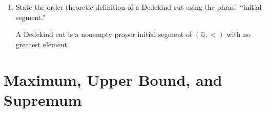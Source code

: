 \documentclass{self-check}
\begin{document}
\begin{enumerate}[label=\arabic*., itemsep=10pt]
\begin{answer}
Yes, but then the axioms would need to be changed, for example by requiring $B$ to have no least element instead. It is a different endpoint convention.
\end{answer}

\item State the order-theoretic definition of a Dedekind cut using the phrase ``initial segment.''

\begin{answer}
A Dedekind cut is a nonempty proper initial segment of $(\mathbb{Q},<)$ with no greatest element.
\end{answer}

\end{enumerate}

\section{Maximum, Upper Bound, and Supremum}
\end{document}
